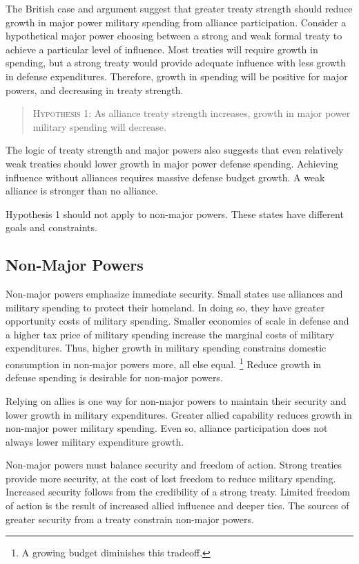 \documentclass[12pt]{article}
\begin{document}
The British case and argument suggest that greater treaty strength should reduce growth in major power military spending from alliance participation.
Consider a hypothetical major power choosing between a strong and weak formal treaty to achieve a particular level of influence.  
Most treaties will require growth in spending, but a strong treaty would provide adequate influence with less growth in defense expenditures. 
Therefore, growth in spending will be positive for major powers, and decreasing in treaty strength. 


\begin{quote}
\textsc{Hypothesis 1}: As alliance treaty strength increases, growth in major power military spending will decrease. 
\end{quote}


The logic of treaty strength and major powers also suggests that even relatively weak treaties should lower growth in major power defense spending. 
Achieving influence without alliances requires massive defense budget growth. 
A weak alliance is stronger than no alliance. 


Hypothesis 1 should not apply to non-major powers. 
These states have different goals and constraints. 


\subsection{Non-Major Powers} 


Non-major powers emphasize immediate security.
Small states use alliances and military spending to protect their homeland.  
In doing so, they have greater opportunity costs of military spending. 
Smaller economies of scale in defense and a higher tax price of military spending increase the marginal costs of military expenditures. 
Thus, higher growth in military spending constrains domestic consumption in non-major powers more, all else equal.
\footnote{A growing budget diminishes this tradeoff.} 
Reduce growth in defense spending is desirable for non-major powers.


Relying on allies is one way for non-major powers to maintain their security and lower growth in military expenditures.  
Greater allied capability reduces growth in non-major power military spending. 
Even so, alliance participation does not always lower military expenditure growth.


Non-major powers must balance security and freedom of action. 
Strong treaties provide more security, at the cost of lost freedom to reduce military spending. 
Increased security follows from the credibility of a strong treaty. 
Limited freedom of action is the result of increased allied influence and deeper ties. 
The sources of greater security from a treaty constrain non-major powers. 
\end{document}
